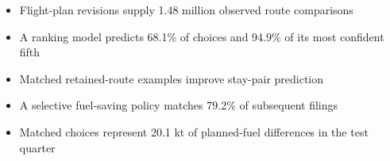 \begin{itemize}
\item Flight-plan revisions supply 1.48 million observed route comparisons
\item A ranking model predicts 68.1\% of choices and 94.9\% of its most confident fifth
\item Matched retained-route examples improve stay-pair prediction
\item A selective fuel-saving policy matches 79.2\% of subsequent filings
\item Matched choices represent 20.1 kt of planned-fuel differences in the test quarter
\end{itemize}
